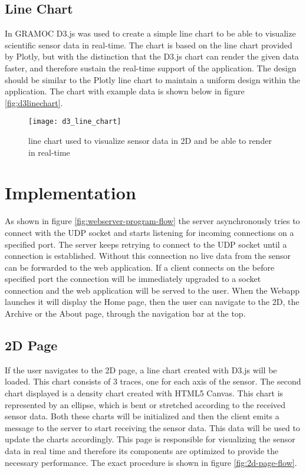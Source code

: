 \subsection{Line Chart}
\label{subsec:d3linechart}
In GRAMOC D3.js was used to create a simple line chart to be able to visualize scientific sensor data in real-time. The chart is based on the line chart provided by Plotly, but with the distinction that the D3.js chart can render the given data faster, and therefore sustain the real-time support of the application. The design should be similar to the Plotly line chart to maintain a uniform design within the application. The chart with example data is shown below in figure \vref{fig:d3linechart}.

\begin{figure}[H]
    \centering
    \texttt{[image: d3\_line\_chart]}
    \caption{line chart used to visualize sensor data in 2D and be able to render in real-time}
    \label{fig:d3linechart}
\end{figure}

\section{Implementation}
As shown in figure \vref{fig:webserver-program-flow} the server asynchronously tries to connect with the UDP socket and starts listening for incoming connections on a specified port. The server keeps retrying to connect to the UDP socket until a connection is established. Without this connection no live data from the sensor can be forwarded to the web application. If a client connects on the before specified port the connection will be immediately upgraded to a socket connection and the web application will be served to the user. When the Webapp launches it will display the Home page, then the user can navigate to the 2D, the Archive or the About page, through the navigation bar at the top.

\subsection{2D Page}
If the user navigates to the 2D page, a line chart created with D3.js will be loaded. This chart consists of 3 traces, one for each axis of the sensor. The second chart displayed is a density chart created with HTML5 Canvas. This chart is represented by an ellipse, which is bent or stretched according to the received sensor data. Both these charts will be initialized and then the client emits a message to the server to start receiving the sensor data. This data will be used to update the charts accordingly. This page is responsible for visualizing the sensor data in real time and therefore its components are optimized to provide the necessary performance. The exact procedure is shown in figure \vref{fig:2d-page-flow}.

